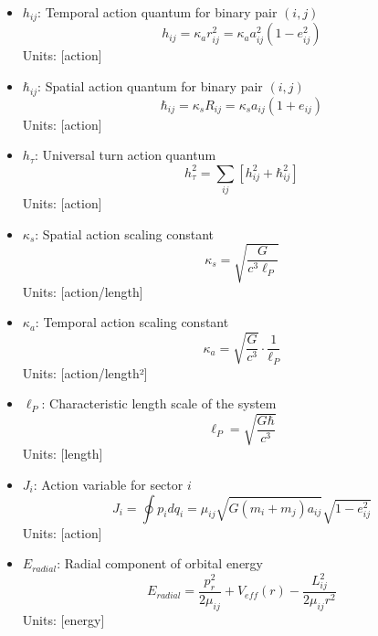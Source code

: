 \documentclass{article}
\begin{document}
\begin{itemize}
\item $h_{ij}$: Temporal action quantum for binary pair $(i,j)$
    \begin{equation}
    h_{ij} = \kappa_a r_{ij}^2 = \kappa_a a_{ij}^2(1-e_{ij}^2)
    \end{equation}
    Units: [action]
    
\item $\hbar_{ij}$: Spatial action quantum for binary pair $(i,j)$
    \begin{equation}
    \hbar_{ij} = \kappa_s R_{ij} = \kappa_s a_{ij}(1+e_{ij})
    \end{equation}
    Units: [action]
    
\item $h_\tau$: Universal turn action quantum
    \begin{equation}
    h_\tau^2 = \sum_{ij} \left[ h_{ij}^2 + \hbar_{ij}^2 \right]
    \end{equation}
    Units: [action]
    
\item $\kappa_s$: Spatial action scaling constant
    \begin{equation}
    \kappa_s = \sqrt{\frac{G}{c^3 \ell_P}}
    \end{equation}
    Units: [action/length]
    
\item $\kappa_a$: Temporal action scaling constant
    \begin{equation}
    \kappa_a = \sqrt{\frac{G}{c^3}} \cdot \frac{1}{\ell_P}
    \end{equation}
    Units: [action/length²]
    
\item $\ell_P$: Characteristic length scale of the system
    \begin{equation}
    \ell_P = \sqrt{\frac{G\hbar}{c^3}}
    \end{equation}
    Units: [length]
    
\item $J_i$: Action variable for sector $i$
    \begin{equation}
    J_i = \oint p_i dq_i = \mu_{ij}\sqrt{G(m_i+m_j)a_{ij}}\sqrt{1-e_{ij}^2}
    \end{equation}
    Units: [action]
    
\item $E_{radial}$: Radial component of orbital energy
    \begin{equation}
    E_{radial} = \frac{p_r^2}{2\mu_{ij}} + V_{eff}(r) - \frac{L_{ij}^2}{2\mu_{ij}r^2}
    \end{equation}
    Units: [energy]
    

\end{itemize}
\end{document}
